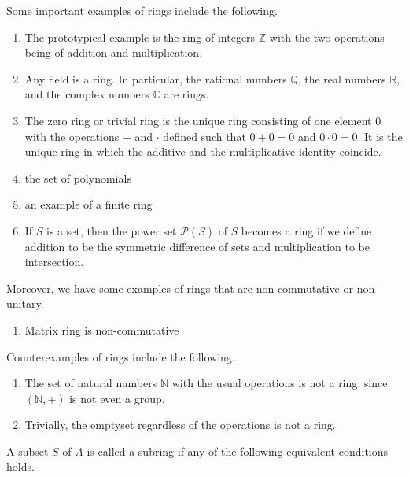 \begin{exmbox}
    \begin{example}
        Some important examples of rings include the following.
        \begin{enumerate}
            \item The prototypical example is the ring of integers \(\mathbb{Z}\) with the two operations being of addition and multiplication.
            \item Any field is a ring. In particular, the rational numbers \(\mathbb{Q}\), the real numbers \(\mathbb{R}\), and the complex numbers \(\mathbb{C}\) are rings.
            \item The zero ring or trivial ring is the unique ring consisting of one element \(0\) with the operations \(+\) and \(\cdot\) defined such that \(0 + 0 = 0\) and \(0 \cdot 0 = 0\). It is the unique ring in which the additive and the multiplicative identity coincide.
            \item the set of polynomials
            \item an example of a finite ring
            \item If \(S\) is a set, then the power set \(\mathcal{P}(S)\) of \(S\) becomes a ring if we define addition to be the symmetric difference of sets and multiplication to be intersection.
        \end{enumerate}
    \end{example}
\end{exmbox}
%
%
%
\begin{example}
    Moreover, we have some examples of rings that are non-commutative or non-unitary.
    \begin{enumerate}
        \item Matrix ring is non-commutative
    \end{enumerate}
\end{example}
%
%
%
\begin{example}
    Counterexamples of rings include the following.
    \begin{enumerate}
        \item The set of natural numbers \(\mathbb{N}\) with the usual operations is not a ring, since \((\mathbb{N}, +)\) is not even a group.
        \item Trivially, the emptyset regardless of the operations is not a ring.
    \end{enumerate}
\end{example}
%
%
%
\begin{defbox}
    \begin{definition}[Subring]
        A subset \(S\) of \(A\) is called a subring if any of the following equivalent conditions holds.
    \end{definition}
\end{defbox}
